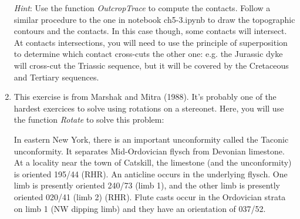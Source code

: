\documentclass[a4paper , 12pt]{book}
\begin{document}
\begin{enumerate}
    \textit{Hint}: Use the function \textit{OutcropTrace} to compute the contacts. Follow a similar procedure to the one in notebook ch5-3.ipynb to draw the topographic contours and the contacts. In this case though, some contacts will intersect. At contacts intersections, you will need to use the principle of superposition to determine which contact cross-cuts the other one: e.g. the Jurassic dyke will cross-cut the Triassic sequence, but it will be covered by the Cretaceous and Tertiary sequences.
    
    \item This exercise is from Marshak and Mitra (1988). It's probably one of the hardest exercices to solve using rotations on a stereonet. Here, you will use the function \textit{Rotate} to solve this problem:
    
    In eastern New York, there is an important unconformity called the Taconic unconformity. It separates Mid-Ordovician flysch from Devonian limestone. At a locality near the town of Catskill, the limestone (and the unconformity) is oriented 195/44 (RHR). An anticline occurs in the underlying flysch. One limb is presently oriented 240/73 (limb 1), and the other limb is presently oriented 020/41 (limb 2) (RHR). Flute casts occur in the Ordovician strata on limb 1 (NW dipping limb) and they have an orientation of 037/52.
    

\end{enumerate}
\end{document}
